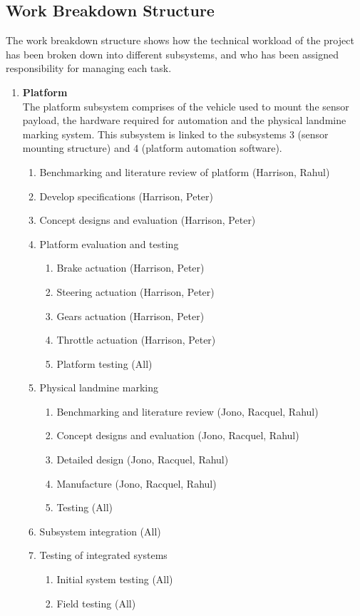 \documentclass[main.tex]{subfiles}
\begin{document}
\begin{appendices}
\chapter{Work Breakdown Structure}
The work breakdown structure shows how the technical workload of the project has been broken down into different  subsystems, and who has been assigned responsibility for managing each task. 

{
\begin{enumerate}
\item \textbf{Platform}\\
The platform subsystem comprises of the vehicle used to mount the sensor payload, the hardware required for automation and the physical landmine marking system. This subsystem is linked to the subsystems 3 (sensor mounting structure) and 4 (platform automation software).
	\begin{enumerate}[label*=\arabic*.]
	\item Benchmarking and literature review of platform (Harrison, Rahul)
    \item Develop specifications (Harrison, Peter)
    \item Concept designs and evaluation (Harrison, Peter)
	\item Platform evaluation and testing
    	\begin{enumerate}[label*=\arabic*.]
		\item Brake actuation (Harrison, Peter)
        \item Steering actuation (Harrison, Peter)
        \item Gears actuation (Harrison, Peter)
        \item Throttle actuation (Harrison, Peter)
        \item Platform testing (All)
        \end{enumerate}
    \item Physical landmine marking
    	\begin{enumerate}[label*=\arabic*.]
		\item Benchmarking and literature review (Jono, Racquel, Rahul)
        \item Concept designs and evaluation (Jono, Racquel, Rahul)
        \item Detailed design (Jono, Racquel, Rahul)
        \item Manufacture (Jono, Racquel, Rahul)
        \item Testing (All)
        \end{enumerate}
    \item Subsystem integration (All)
    \item Testing of integrated systems
    	\begin{enumerate}[label*=\arabic*.]
		\item Initial system testing (All)
        \item Field testing (All)
        \end{enumerate}
	\end{enumerate}
    

\end{enumerate}}
\end{appendices}
\end{document}

